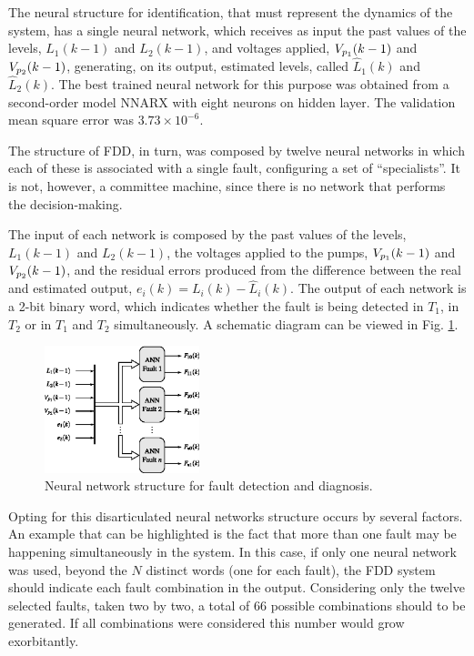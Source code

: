 \documentclass[10pt,fleqn,a4paper]{article}
\begin{document}
The neural structure for identification, that must represent the dynamics of the
system, has a single neural network, which receives as input the past values of
the levels, $L_1(k-1)$ and $L_2 (k-1)$, and voltages applied, $V_{p_{\tiny 1}}
(k-1)$ and $V_{p_{\tiny 2}} (k-1)$, generating, on its output, estimated levels,
called $\widehat{L}_1 (k)$ and $\widehat{L}_2 (k)$.  The best trained neural
network for this purpose was obtained from a second-order model NNARX with eight
neurons on hidden layer. The validation mean square error was $3.73 \times
10^{-6}$.

The structure of FDD, in turn, was composed by twelve neural networks in which
each of these is associated with a single fault, configuring a set of
``specialists''. It is not, however, a committee machine, since there is no
network that performs the decision-making.

The input of each network is composed by the past values of the levels,
$L_1(k-1)$ and $L_2(k-1)$, the voltages applied to the pumps, $V_{p_{\tiny 1}}
(k-1)$ and $V_{p_{\tiny 2}} (k-1)$, and the residual errors produced from the
difference between the real and estimated output, $e_i (k) = L_i (k) -
\widehat{L}_i (k)$. The output of each network is a 2-bit binary word, which
indicates whether the fault is being detected in $T_1$, in $T_2$ or in $T_1$ and
$T_2$ simultaneously. A schematic diagram can be viewed in Fig.
\ref{fig:ann_fdd}.

\begin{figure}[htb]
\centering
    \includegraphics[width=0.4\textwidth]{imgs/ann_fdd}
    \caption{Neural network structure for fault detection and diagnosis.}
    \label{fig:ann_fdd}
\end{figure}

Opting for this disarticulated neural networks structure occurs by several
factors. An example that can be highlighted is the fact that more than one fault
may be happening simultaneously in the system. In this case, if only one neural
network was used, beyond the $N$ distinct words (one for each fault), the FDD
system should indicate each fault combination in the output. Considering only
the twelve selected faults, taken two by two, a total of 66 possible
combinations should to be generated. If all combinations were considered this
number would grow exorbitantly.
\end{document}
